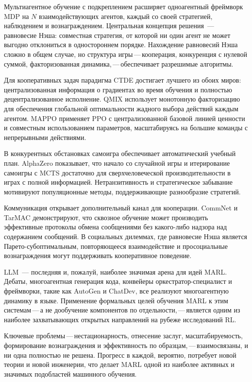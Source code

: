 Мультиагентное обучение с подкреплением расширяет одноагентный фреймворк MDP
на $N$ взаимодействующих агентов, каждый со своей стратегией,
наблюдением и вознаграждением. Центральная концепция решения~---
равновесие Нэша: совместная стратегия, от которой ни один агент не может выгодно
отклониться в одностороннем порядке. Нахождение равновесий Нэша сложно в общем случае,
но структура игры\,---\,кооперация, конкуренция с нулевой суммой,
факторизованная динамика,\,---\,обеспечивает разрешимые алгоритмы.

Для кооперативных задач парадигма CTDE достигает лучшего из
обоих миров: централизованная информация о градиентах во время обучения и
полностью децентрализованное исполнение. QMIX использует монотонную
факторизацию для обеспечения глобальной оптимальности жадного выбора действий каждым агентом.
MAPPO применяет PPO с централизованной базовой линией ценности и
совместным использованием параметров, масштабируясь на большие команды с непрерывными действиями.

В конкурентных обстановках самоигра обеспечивает автоматический учебный план.
AlphaZero показывает, что начало со случайной игры и итерирование
самоигры с MCTS достаточно для сверхчеловеческой производительности в
играх с полной информацией. Нетранзитивность и стратегическое забывание
мотивируют популяционные методы, поддерживающие разнообразие стратегий.

Коммуникация открывает дополнительный канал для кооперации.
CommNet и TarMAC демонстрируют, что сквозное обучение может
производить эффективные протоколы обмена сообщениями без какого-либо надзора
над содержанием сообщений. В социальных дилеммах, где равновесие Нэша
является Парето-субоптимальным, повторяющееся взаимодействие и просоциальные
вознаграждения могут поддерживать кооперативное поведение.

LLM~--- последняя и, пожалуй, наиболее значимая арена для идей MARL.
Дебаты, многоагентная генерация кода, конвейеры оркестратор-специалист
и фреймворки, такие как AutoGen и ChatDev, все реализуют
многоагентную динамику в языке. Применение формальных целей обучения MARL
к этим системам\,---\,а не дообучение компонентов
по отдельности,\,---\,является одним из наиболее захватывающих открытых направлений на
рубеже исследований RL.

Ключевые проблемы\,---\,нестационарность, отнесение заслуг,
масштабируемость, формирование вознаграждения и эффективность по образцам,\,---\,взаимосвязаны, и ни одна полностью не решена. Прогресс в каждой, вероятно,
потребует новой теории и новой инженерии, что делает MARL одной из
наиболее активных и значимых подобластей машинного обучения.

